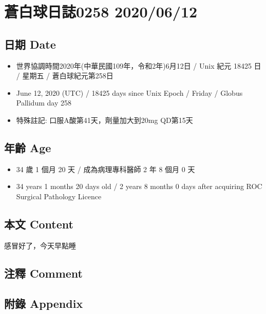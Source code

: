 \documentclass[
]{article}
\providecommand{\tightlist}{%
  \setlength{\itemsep}{0pt}\setlength{\parskip}{0pt}}
\begin{document}
\hypertarget{ux84bcux767dux7403ux65e5ux8a8c0258-20200612}{%
\section{蒼白球日誌0258
2020/06/12}\label{ux84bcux767dux7403ux65e5ux8a8c0258-20200612}}

\hypertarget{ux65e5ux671f-date-11}{%
\subsection{日期 Date}\label{ux65e5ux671f-date-11}}

\begin{itemize}
\tightlist
\item
  世界協調時間2020年(中華民國109年，令和2年)6月12日 / Unix 紀元 18425 日
  / 星期五 / 蒼白球紀元第258日
\item
  June 12, 2020 (UTC) / 18425 days since Unix Epoch / Friday / Globus
  Pallidum day 258
\item
  特殊註記: 口服A酸第41天，劑量加大到20mg QD第15天
\end{itemize}

\hypertarget{ux5e74ux9f61-age-11}{%
\subsection{年齡 Age}\label{ux5e74ux9f61-age-11}}

\begin{itemize}
\tightlist
\item
  34 歲 1 個月 20 天 / 成為病理專科醫師 2 年 8 個月 0 天
\item
  34 years 1 months 20 days old / 2 years 8 months 0 days after
  acquiring ROC Surgical Pathology Licence
\end{itemize}

\hypertarget{ux672cux6587-content-11}{%
\subsection{本文 Content}\label{ux672cux6587-content-11}}

感冒好了，今天早點睡

\hypertarget{ux6ce8ux91cb-comment-11}{%
\subsection{注釋 Comment}\label{ux6ce8ux91cb-comment-11}}

\hypertarget{ux9644ux9304-appendix-11}{%
\subsection{附錄 Appendix}\label{ux9644ux9304-appendix-11}}
\end{document}
